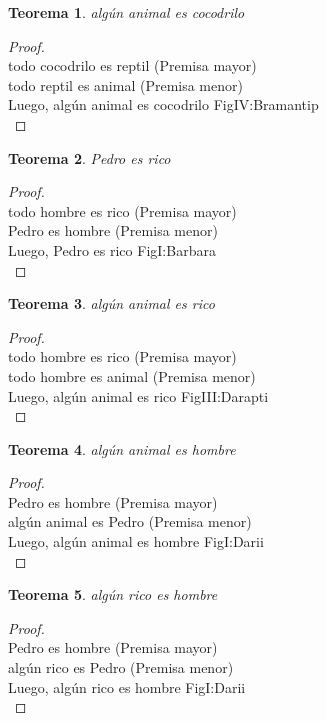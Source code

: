 ﻿\documentclass[12pt]{book}
\newtheorem{theorem}{Teorema}[chapter]
\newtheorem{proof}{Demostración}
\begin{document}
\begin{theorem}
algún animal es cocodrilo
\label{th: 37}
\end{theorem}\begin{proof}\\todo cocodrilo es reptil	 (Premisa mayor) \\todo reptil es animal	 (Premisa menor) \\Luego, algún animal es cocodrilo	FigIV:Bramantip \\ \end{proof}
\begin{theorem}
Pedro es rico
\label{th: 38}
\end{theorem}\begin{proof}\\todo hombre es rico	 (Premisa mayor) \\Pedro es hombre	 (Premisa menor) \\Luego, Pedro es rico	FigI:Barbara \\ \end{proof}
\begin{theorem}
algún animal es rico
\label{th: 39}
\end{theorem}\begin{proof}\\todo hombre es rico	 (Premisa mayor) \\todo hombre es animal	 (Premisa menor) \\Luego, algún animal es rico	FigIII:Darapti \\ \end{proof}
\begin{theorem}
algún animal es hombre
\label{th: 40}
\end{theorem}\begin{proof}\\Pedro es hombre	 (Premisa mayor) \\algún animal es Pedro	 (Premisa menor) \\Luego, algún animal es hombre	FigI:Darii \\ \end{proof}
\begin{theorem}
algún rico es hombre
\label{th: 41}
\end{theorem}\begin{proof}\\Pedro es hombre	 (Premisa mayor) \\algún rico es Pedro	 (Premisa menor) \\Luego, algún rico es hombre	FigI:Darii \\ \end{proof}
\end{document}
